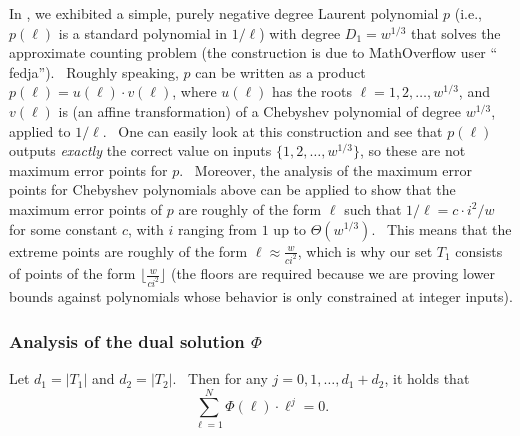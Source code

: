 In 
, we exhibited a simple, purely negative degree Laurent polynomial $p$
(i.e., $p(\ell )$ is a standard polynomial in $1/\ell $) with degree $
D_{1}=w^{1/3}$ that solves the approximate counting problem (the
construction is due to MathOverflow user \textquotedblleft
fedja\textquotedblright ). \ Roughly speaking, $p$ can be written as a
product $p(\ell )=u(\ell )\cdot v(\ell )$, where $u(\ell )$ has the roots $
\ell =1,2,\dots ,w^{1/3}$, and $v(\ell )$ is (an affine transformation) of a
Chebyshev polynomial of degree $w^{1/3}$, applied to $1/\ell $. \ One can
easily look at this construction and see that $p(\ell )$ outputs \emph{
exactly} the correct value on inputs $\{1,2,\dots ,w^{1/3}\}$, so these are
not maximum error points for $p$. \ Moreover, the analysis of the maximum
error points for Chebyshev polynomials above can be applied to show that the
maximum error points of $p$ are roughly of the form $\ell $ such that $
1/\ell =c\cdot i^{2}/w$ for some constant $c$, with $i$ ranging from $1$ up
to $\Theta (w^{1/3})$. \ This means that the extreme points are roughly of
the form $\ell \approx \frac{w}{ci^{2}}$, which is why our set $T_{1}$
consists of points of the form $\lfloor \frac{w}{ci^{2}}\rfloor $ (the
floors are required because we are proving lower bounds against polynomials
whose behavior is only constrained at integer inputs).

\subsubsection{Analysis of the dual solution \texorpdfstring{$\Phi$}{Phi}}

\begin{lemma}
\label{phdlem}Let $d_{1}=|T_{1}|$ and $d_{2}=|T_{2}|$. \ Then for any $
j=0,1,\dots ,d_{1}+d_{2}$, it holds that
\begin{equation*}
\sum_{\ell =1}^{N}\Phi (\ell )\cdot \ell ^{j}=0.
\end{equation*}
\end{lemma}

